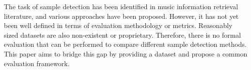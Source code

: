 \documentclass{article}
\begin{document}
The task of sample detection has been identified in music information retrieval literature, and various approaches have been proposed. However, it has not yet been well defined in terms of evaluation methodology or metrics. Reasonably sized datasets are also non-existent or proprietary. Therefore, there is no formal evaluation that can be performed to compare different sample detection methods. This paper aims to bridge this gap by providing a dataset and propose a common evaluation framework.%
\end{document}
